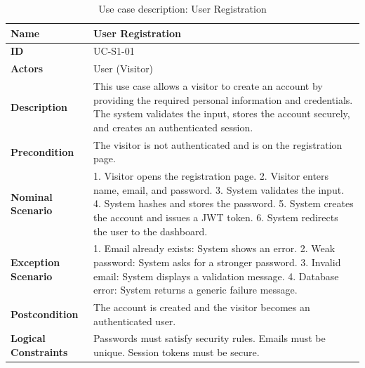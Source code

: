 \begin{table}[H]
    \centering
    \caption{Use case description: User Registration}
    \label{tab:register-usecase}
    \renewcommand{\arraystretch}{1.4}
    \small
    \begin{tabularx}{\textwidth}{|p{2.5cm}|X|}
        \hline
        \textbf{Name} & User Registration \\\hline
        \textbf{ID} & UC-S1-01 \\\hline
        \textbf{Actors} & User (Visitor) \\\hline
        \textbf{Description} & This use case allows a visitor to create an account by providing the required personal information and credentials. The system validates the input, stores the account securely, and creates an authenticated session. \\\hline
        \textbf{Precondition} & The visitor is not authenticated and is on the registration page. \\\hline
        \textbf{Nominal Scenario} & 1. Visitor opens the registration page. 2. Visitor enters name, email, and password. 3. System validates the input. 4. System hashes and stores the password. 5. System creates the account and issues a JWT token. 6. System redirects the user to the dashboard. \\\hline
        \textbf{Exception Scenario} & 1. Email already exists: System shows an error. 2. Weak password: System asks for a stronger password. 3. Invalid email: System displays a validation message. 4. Database error: System returns a generic failure message. \\\hline
        \textbf{Postcondition} & The account is created and the visitor becomes an authenticated user. \\\hline
        \textbf{Logical Constraints} & Passwords must satisfy security rules. Emails must be unique. Session tokens must be secure. \\\hline
    \end{tabularx}
\end{table}

